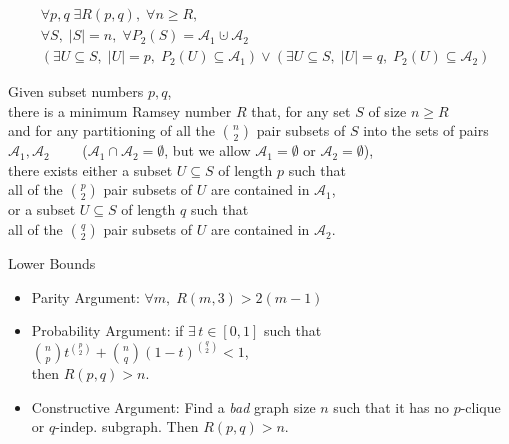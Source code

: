 \documentclass[letterpaper,12pt]{article}
\author{Dylan Hutchison}
\theoremstyle{plain}
\newtheorem{thm}{Theorem}%
\theoremstyle{definition}
\theoremstyle{remark}
\newtheorem{remark}{Remark}
\theoremstyle{definition}
\newenvironment{myindentpar}[1]%
 {\begin{list}{}%
         {\setlength{\leftmargin}{#1}}%
         \item[]%
 }
 {\end{list}}
\begin{document}
\begin{align*}
&\forall p,q \;\exists R(p,q),\; \forall n \geq R, \\
&\forall S, \;|S|=n, \;\forall P_2(S)=\mathcal{A}_1 \cupdot \mathcal{A}_2 \\
&(\exists U \subseteq S, \; |U|=p, \; P_2(U) \subseteq \mathcal{A}_1) \lor (\exists U \subseteq S, \; |U|=q, \; P_2(U) \subseteq \mathcal{A}_2) 
\end{align*}

\begin{myindentpar}{2em}
Given subset numbers $p,q$, \\
there is a minimum Ramsey number $R$ that, for any set $S$ of size $n \geq R$ \\
and for any partitioning of all the $\binom{n}{2}$ pair subsets of $S$ into the sets of pairs \\
\phantom{$\qquad$} $\mathcal{A}_1, \mathcal{A}_2 \qquad$ ($\mathcal{A}_1 \cap \mathcal{A}_2 = \emptyset$, but we allow $\mathcal{A}_1 = \emptyset$ or $\mathcal{A}_2 = \emptyset$), \\
there exists either a subset $U \subseteq S$ of length $p$ such that \\
\phantom{$\qquad$} all of the $\binom{p}{2}$ pair subsets of $U$ are contained in $\mathcal{A}_1$, \\
or a subset $U \subseteq S$ of length $q$ such that \\
\phantom{$\qquad$} all of the $\binom{q}{2}$ pair subsets of $U$ are contained in $\mathcal{A}_2$.
\end{myindentpar}

Lower Bounds
\begin{itemize}
\item Parity Argument: $\forall m, \; R(m,3) > 2(m-1)$
\item Probability Argument: if $\exists\, t \in [0,1]$ such that $\binom{n}{p}t^{\binom{p}{2}} + \binom{n}{q}(1-t)^{\binom{q}{2}} < 1$, \\
\phantom{Probability Argument:} then $R(p,q) > n$.
\item Constructive Argument: Find a \textit{bad} graph size $n$ such that it has no $p$-clique \\
\phantom{Constructive Argument:} or $q$-indep. subgraph. Then $R(p,q) > n$.
\end{itemize}
\end{document}
